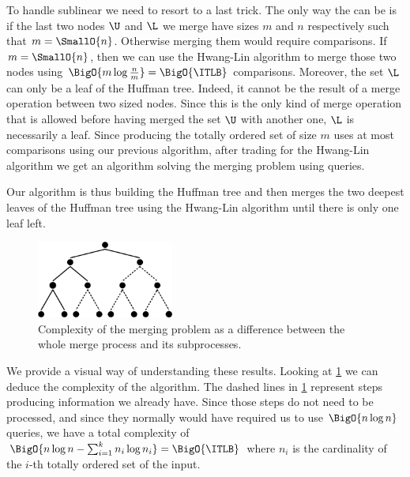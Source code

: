 To handle sublinear \ITLB we need to resort to a last trick. The only
way the \ITLB can be  is if the last two nodes \(\U\) and
\(\L\) we merge have sizes \(m\) and \(n\) respectively such that \(m =
\SmallO{n}\). Otherwise merging them would require  comparisons.
If \(m = \SmallO{n}\), then we can use the Hwang-Lin algorithm to merge those
two nodes using \(\BigO{m \log \frac{n}{m}} = \BigO{\ITLB}\) comparisons. Moreover, the set
\(\L\) can only be a leaf of the Huffman tree. Indeed, it cannot be the result
of a merge operation between two  sized nodes. Since this is the only
kind of merge operation that is allowed before having merged the set \(\U\)
with another one, \(\L\) is necessarily a leaf. Since producing the totally ordered
set of size \(m\) uses at most \BigO{\ITLB} comparisons using our
previous algorithm, after trading
\tapemerge for the Hwang-Lin algorithm we get an algorithm
solving the merging problem using \BigO{\ITLB} queries.

Our algorithm is thus building the Huffman tree and then merges the two deepest
leaves of the Huffman tree using the Hwang-Lin algorithm until there is only
one leaf left.

\begin{figure}
	\centering
	\includegraphics[width=0.4\textwidth]{fig/merging/huffman-2-trim}
	\caption{Complexity of the merging problem as a difference between the whole merge process and its subprocesses.}
	\label{tree:merging:fig/huffman-2}
\end{figure}

We provide a visual way of understanding these results. Looking at
\ref{tree:merging:fig/huffman-2} we can deduce the complexity of the algorithm.
The dashed lines in \ref{tree:merging:fig/huffman-2} represent steps producing
information we already have. Since those steps do not need to be processed, and
since they normally would have required us to use \(\BigO{n \log n}\) queries, we have a
total complexity of $\BigO{n \log n - \sum_{i=1}^{k} n_i \log n_i} =
\BigO{\ITLB}$ where $n_i$ is the cardinality of the $i$-th totally ordered set
of the input.
